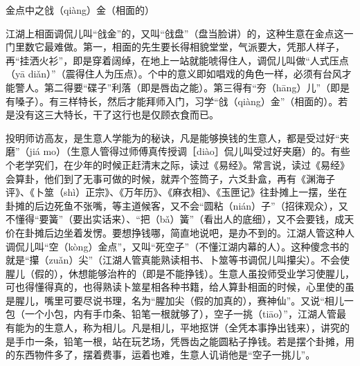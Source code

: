 \documentclass[12pt,UTF8]{ctexbook}
\begin{document}
金点中之戗（qiàng）金（相面的）


江湖上相面调侃儿叫“戗金”的，又叫“戗盘”（盘当脸讲）的，这种生意在金点这一门里数它最难做。第一，相面的先生要长得相貌堂堂，气派要大，凭那人样子，再“挂洒火衫”，即是穿着阔绰，在地上一站就能唬得住人，调侃儿叫做“人式压点（yā diǎn）”（震得住人为压点）。个中的意义即如唱戏的角色一样，必须有台风才能警人。第二得要“碟子”利落（即是唇齿之能）。第三得有“夯（hāng）儿”（即是有嗓子）。有三样特长，然后才能拜师入门，习学“戗（qiàng）金”（相面的）。若是没有这三大特长，干了这行也是仅顾衣食而已。

投明师访高友，是生意人学能为的秘诀，凡是能够换钱的生意人，都是受过好“夹磨”（jiá mo）（生意人管得过师傅真传授调［diào］侃儿叫受过好夹磨）的。有些个老学究们，在少年的时候正赶清末之际，读过《易经》。常言说，读过《易经》会算卦，他们到了无事可做的时候，就弄个签筒子，六爻卦盒，再有《渊海子评》、《卜筮（shì）正宗》、《万年历》、《麻衣相》、《玉匣记》往卦摊上一摆，坐在卦摊的后边死鱼不张嘴，等主道候客，又不会“圆粘（nián）子”（招徕观众），又不懂得“要簧”（要出实话来）、“把（bǎ）簧”（看出人的底细），又不会要钱，成天价在卦摊后边坐着发愣。要想挣钱哪，简直地说吧，是办不到的。江湖人管这种人调侃儿叫“空（kòng）金点”，又叫“死空子”（不懂江湖内幕的人）。这种傻念书的就是“攥（zuǎn）尖”（江湖人管真能熟读相书、卜筮等书调侃儿叫攥尖）。不会使腥儿（假的），休想能够治杵的（即是不能挣钱）。生意人虽投师受业学习使腥儿，可也得懂得真的，也得熟读卜筮星相各种书籍，给人算卦相面的时候，心里使的虽是腥儿，嘴里可要尽说书理，名为“腥加尖（假的加真的），赛神仙”。又说“相儿一包（一个小包，内有手巾条、铅笔一根就够了），空子一挑（tiāo）”，江湖人管最有能为的生意人，称为相儿。凡是相儿，平地抠饼（全凭本事挣出钱来），讲究的是手巾一条，铅笔一根，站在玩艺场，凭唇齿之能圆粘子挣钱。若是摆个卦摊，用的东西物件多了，摆着费事，运着也难，生意人讥诮他是“空子一挑儿”。
\end{document}
